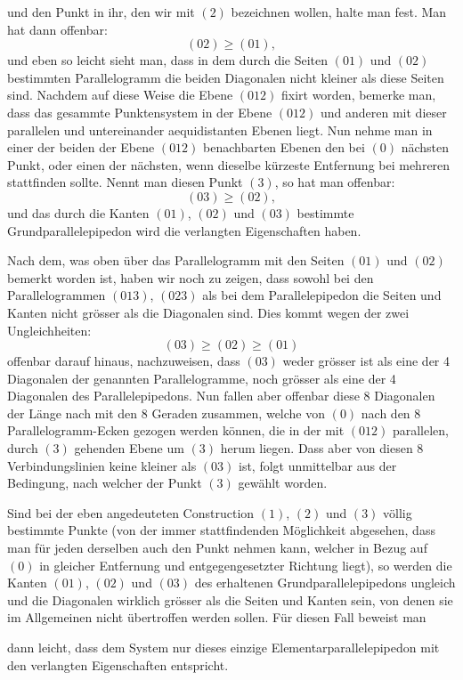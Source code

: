 \documentclass[11pt]{article}
\begin{document}
und den Punkt in ihr, den wir mit $(2)$ bezeichnen wollen, halte man fest. Man hat dann offenbar:
\[
(02) \geq (01),
\]
und eben so leicht sieht man, dass in dem durch die Seiten $(01)$ und $(02)$ bestimmten Parallelogramm die beiden Diagonalen nicht kleiner als diese Seiten sind. Nachdem auf diese Weise die Ebene $(012)$ fixirt worden, bemerke man, dass das gesammte Punktensystem in der Ebene $(012)$ und anderen mit dieser parallelen und untereinander aequidistanten Ebenen liegt. Nun nehme man in einer der beiden der Ebene $(012)$ benachbarten Ebenen den bei $(0)$ nächsten Punkt, oder einen der nächsten, wenn dieselbe kürzeste Entfernung bei mehreren stattfinden sollte. Nennt man diesen Punkt $(3)$, so hat man offenbar:
\[
(03) \geq (02),
\]
und das durch die Kanten $(01)$, $(02)$ und $(03)$ bestimmte Grundparallelepipedon wird die verlangten Eigenschaften haben.

Nach dem, was oben über das Parallelogramm mit den Seiten $(01)$ und $(02)$ bemerkt worden ist, haben wir noch zu zeigen, dass sowohl bei den Parallelogrammen $(013)$, $(023)$ als bei dem Parallelepipedon die Seiten und Kanten nicht grösser als die Diagonalen sind. Dies kommt wegen der zwei Ungleichheiten:
\[
(03) \geq (02) \geq (01)
\]
offenbar darauf hinaus, nachzuweisen, dass $(03)$ weder grösser ist als eine der 4 Diagonalen der genannten Parallelogramme, noch grösser als eine der 4 Diagonalen des Parallelepipedons. Nun fallen aber offenbar diese 8 Diagonalen der Länge nach mit den 8 Geraden zusammen, welche von $(0)$ nach den 8 Parallelogramm-Ecken gezogen werden können, die in der mit $(012)$ parallelen, durch $(3)$ gehenden Ebene um $(3)$ herum liegen. Dass aber von diesen 8 Verbindungslinien keine kleiner als $(03)$ ist, folgt unmittelbar aus der Bedingung, nach welcher der Punkt $(3)$ gewählt worden.

Sind bei der eben angedeuteten Construction $(1)$, $(2)$ und $(3)$ völlig bestimmte Punkte (von der immer stattfindenden Möglichkeit abgesehen, dass man für jeden derselben auch den Punkt nehmen kann, welcher in Bezug auf $(0)$ in gleicher Entfernung und entgegengesetzter Richtung liegt), so werden die Kanten $(01)$, $(02)$ und $(03)$ des erhaltenen Grundparallelepipedons ungleich und die Diagonalen wirklich grösser als die Seiten und Kanten sein, von denen sie im Allgemeinen nicht übertroffen werden sollen. Für diesen Fall beweist man

dann leicht, dass dem System nur dieses einzige Elementarparallelepipedon mit den verlangten Eigenschaften entspricht.
\end{document}
